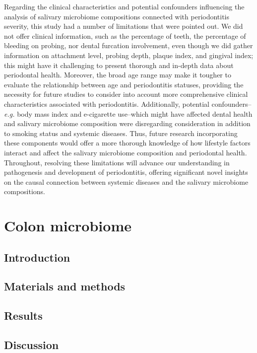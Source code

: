 \documentclass[11pt, a4paper, onecolumn, oneside]{report}
\begin{document}
            Regarding the clinical characteristics and potential confounders influencing the analysis of salivary microbiome compositions connected with periodontitis severity, this study had a number of limitations that were pointed out. We did not offer clinical information, such as the percentage of teeth, the percentage of bleeding on probing, nor dental furcation involvement, even though we did gather information on attachment level, probing depth, plaque index, and gingival index; this might have it challenging to present thorough and in-depth data about periodontal health. Moreover, the broad age range may make it tougher to evaluate the relationship between age and periodontitis statuses, providing the necessity for future studies to consider into account more comprehensive clinical characteristics associated with periodontitis. Additionally, potential confounders--\textit{e.g.} body mass index and e-cigarette use--which might have affected dental health and salivary microbiome composition were disregarding consideration in addition to smoking status and systemic diseases. Thus, future research incorporating these components would offer a more thorough knowledge of how lifestyle factors interact and affect the salivary microbiome composition and periodontal health. Throughout, resolving these limitations will advance our understanding in pathogenesis and development of periodontitis, offering significant novel insights on the causal connection between systemic diseases and the salivary microbiome compositions.
        \newpage

    \section{Colon microbiome}
        \label{section:colon}
        \subsection{Introduction}
        \clearpage

        \subsection{Materials and methods}
        \clearpage

        \subsection{Results}
        \clearpage

        \subsection{Discussion}
        \clearpage
    \newpage
\end{document}
